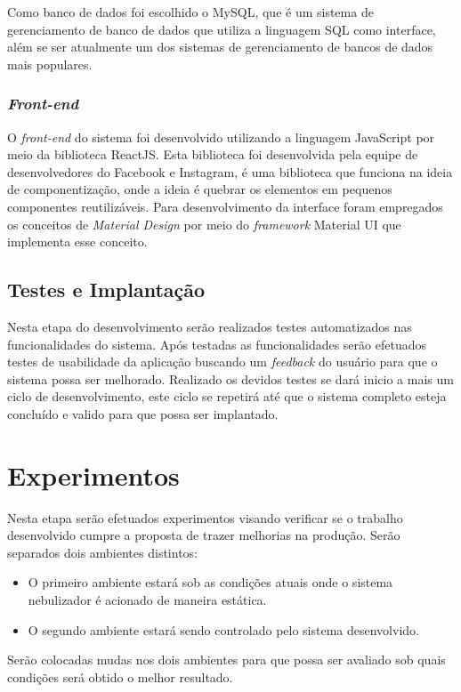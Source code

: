 Como banco de dados foi escolhido o MySQL, que é um sistema de gerenciamento de banco de dados que utiliza a linguagem SQL como interface, além se ser atualmente um dos sistemas de gerenciamento de bancos de dados mais populares.

\vfill

\subsubsection{\textit{Front-end}}
O \textit{front-end} do sistema foi desenvolvido utilizando a linguagem JavaScript por meio da biblioteca ReactJS. Esta biblioteca foi desenvolvida pela equipe de desenvolvedores do Facebook e Instagram, é uma biblioteca que funciona na ideia de componentização, onde a ideia é quebrar os elementos em pequenos componentes reutilizáveis. Para desenvolvimento da interface foram empregados os conceitos de \textit{Material Design} por meio do \textit{framework} Material UI que implementa esse conceito.

\subsection{Testes e Implantação}
Nesta etapa do desenvolvimento serão realizados testes automatizados nas funcionalidades do sistema. Após testadas as funcionalidades serão efetuados testes de usabilidade da aplicação buscando um \textit{feedback} do usuário para que o sistema possa ser melhorado. Realizado os devidos testes se dará inicio a mais um ciclo de desenvolvimento, este ciclo se repetirá até que o sistema completo esteja concluído e valido para que possa ser implantado.

\section{Experimentos}
Nesta etapa serão efetuados experimentos visando verificar se o trabalho desenvolvido cumpre a proposta de trazer melhorias na produção. Serão separados dois ambientes distintos:

\begin{itemize}[itemsep=0em]
\item O primeiro ambiente estará sob as condições atuais onde o sistema nebulizador é acionado de maneira estática.
\item O segundo ambiente estará sendo controlado pelo sistema desenvolvido.
\end{itemize}

Serão colocadas mudas nos dois ambientes para que possa ser avaliado sob quais condições será obtido o melhor resultado.